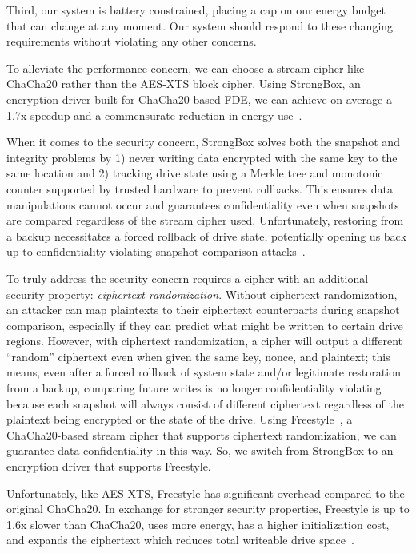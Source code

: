 Third, our system is battery constrained, placing a cap on our energy budget
that can change at any moment. Our system should respond to these changing
requirements without violating any other concerns.

To alleviate the performance concern, we can choose a stream cipher like
ChaCha20 rather than the AES-XTS block cipher. Using StrongBox, an encryption
driver built for ChaCha20-based FDE, we can achieve on average a 1.7x speedup
and a commensurate reduction in energy use~\cite{StrongBox}.

When it comes to the security concern, StrongBox solves both the snapshot and
integrity problems by 1) never writing data encrypted with the same key to the
same location and 2) tracking drive state using a Merkle tree and monotonic
counter supported by trusted hardware to prevent rollbacks. This ensures data
manipulations cannot occur and guarantees confidentiality even when snapshots
are compared regardless of the stream cipher used. Unfortunately, restoring from
a backup necessitates a forced rollback of drive state, potentially opening us
back up to confidentiality-violating snapshot comparison
attacks~\cite{StrongBox}.

To truly address the security concern requires a cipher with an additional
security property: \emph{ciphertext randomization}. Without ciphertext
randomization, an attacker can map plaintexts to their ciphertext counterparts
during snapshot comparison, especially if they can predict what might be written
to certain drive regions. However, with ciphertext randomization, a cipher will
output a different ``random'' ciphertext even when given the same key, nonce,
and plaintext; this means, even after a forced rollback of system state and/or
legitimate restoration from a backup, comparing future writes is no longer
confidentiality violating because each snapshot will always consist of different
ciphertext regardless of the plaintext being encrypted or the state of the
drive. Using Freestyle~\cite{Freestyle}, a ChaCha20-based stream cipher that
supports ciphertext randomization, we can guarantee data confidentiality in this
way. So, we switch from StrongBox to an encryption driver that supports
Freestyle.

Unfortunately, like AES-XTS, Freestyle has significant overhead compared to the
original ChaCha20. In exchange for stronger security properties, Freestyle is up
to 1.6x slower than ChaCha20, uses more energy, has a higher initialization
cost, and expands the ciphertext which reduces total writeable drive
space~\cite{Freestyle}.

